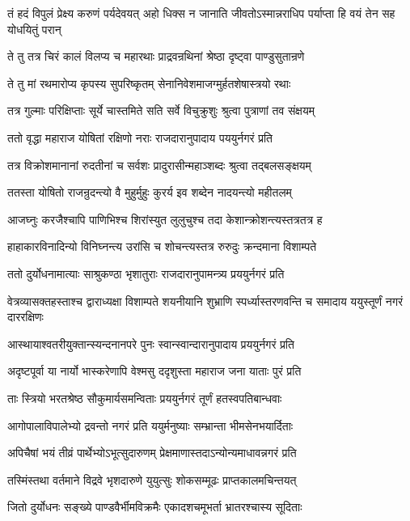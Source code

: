 \threelineshloka
{तं हदं विपुलं प्रेक्ष्य करुणं पर्यदेवयत्}
{अहो धिक्स न जानाति जीवतोऽस्मान्नराधिप}
{पर्याप्ता हि वयं तेन सह योधयितुं परान्}


\twolineshloka
{ते तु तत्र चिरं कालं विलप्य च महारथाः}
{प्राद्रवन्रथिनां श्रेष्ठा दृष्ट्वा पाण्डुसुतान्रणे}


\twolineshloka
{ते तु मां रथमारोप्य कृपस्य सुपरिष्कृतम्}
{सेनानिवेशमाजग्मुर्हतशेषास्त्रयो रथाः}


\twolineshloka
{तत्र गुल्माः परिक्षिप्ताः सूर्ये चास्तमिते सति}
{सर्वे विचुक्रुशुः श्रुत्वा पुत्राणां तव संक्षयम्}


\twolineshloka
{ततो वृद्धा महाराज योषितां रक्षिणो नराः}
{राजदारानुपादाय पययुर्नगरं प्रति}


\twolineshloka
{तत्र विक्रोशमानानां रुदतीनां च सर्वशः}
{प्रादुरासीन्महाञ्शब्दः श्रुत्वा तद्बलसङ्क्षयम्}


\twolineshloka
{ततस्ता योषितो राजन्रुदन्त्यो वै मुहुर्मुहुः}
{कुरर्य इव शब्देन नादयन्त्यो महीतलम्}


\twolineshloka
{आजघ्नुः करजैश्चापि पाणिभिश्च शिरांस्युत}
{लुलुचुश्च तदा केशान्क्रोशन्त्यस्तत्रतत्र ह}


\twolineshloka
{हाहाकारविनादिन्यो विनिघ्नन्त्य उरांसि च}
{शोचन्त्यस्तत्र रुरुदुः क्रन्दमाना विशाम्पते}


\twolineshloka
{ततो दुर्योधनामात्याः साश्रुकण्ठा भृशातुराः}
{राजदारानुपामन्त्र्य प्रययुर्नगरं प्रति}


\threelineshloka
{वेत्रव्यासक्तहस्ताश्च द्वाराध्यक्षा विशाम्पते}
{शयनीयानि शुभ्राणि स्पर्ध्यास्तरणवन्ति च}
{समादाय ययुस्तूर्णं नगरं दाररक्षिणः}


\twolineshloka
{आस्थायाश्वतरीयुक्तान्स्यन्दनानपरे पुनः}
{स्वान्स्वान्दारानुपादाय प्रययुर्नगरं प्रति}


\twolineshloka
{अदृष्टपूर्वा या नार्यो भास्करेणापि वेश्मसु}
{ददृशुस्ता महाराज जना याताः पुरं प्रति}


\twolineshloka
{ताः स्त्रियो भरतश्रेष्ठ सौकुमार्यसमन्विताः}
{प्रययुर्नगरं तूर्णं हतस्वपतिबान्धवाः}


\twolineshloka
{आगोपालाविपालेभ्यो द्रवन्तो नगरं प्रति}
{ययुर्मनुष्याः सम्भ्रान्ता भीमसेनभयार्दिताः}


\twolineshloka
{अपिचैषां भयं तीव्रं पार्थेभ्योऽभूत्सुदारुणम्}
{प्रेक्षमाणास्तदाऽन्योन्यमाधावन्नगरं प्रति}


\twolineshloka
{तस्मिंस्तथा वर्तमाने विद्रवे भृशदारुणे}
{युयुत्सुः शोकसम्मूढः प्राप्तकालमचिन्तयत्}


\twolineshloka
{जितो दुर्योधनः सङ्ख्ये पाण्डवैर्भीमविक्रमैः}
{एकादशचमूभर्ता भ्रातरश्चास्य सूदिताः}


